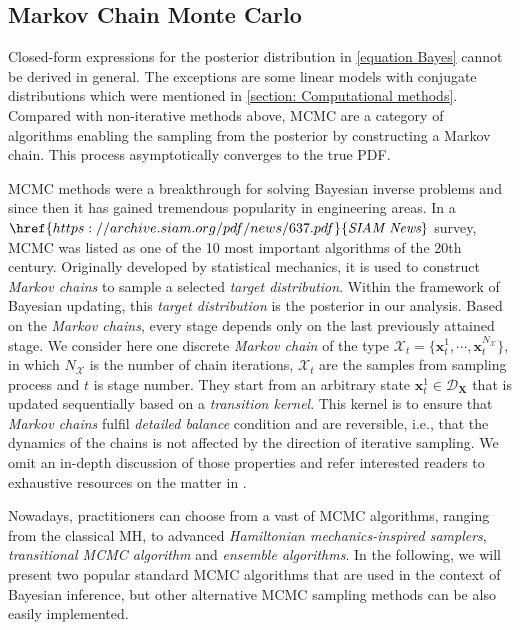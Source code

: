 \subsection{Markov Chain Monte Carlo}
Closed-form expressions for the posterior distribution in \cref{equation Bayes} cannot be derived in general. The exceptions are some linear models with conjugate distributions which were mentioned in \cref{section: Computational methods}. Compared with non-iterative methods above, \acrfull{MCMC} are a category of algorithms enabling the sampling from the posterior by constructing a Markov chain. This process asymptotically converges to the true \acrshort{PDF}.

\acrshort{MCMC} methods were a breakthrough for solving Bayesian inverse problems and since then it has gained tremendous popularity in engineering areas. In a $\href{https://archive.siam.org/pdf/news/637.pdf}{\textit{SIAM News}}$ survey, \acrshort{MCMC} was listed as one of the 10 most important algorithms of the 20th century. Originally developed by statistical mechanics, it is used to construct \textit{Markov chains} to sample a selected \textit{target distribution}. Within the framework of Bayesian updating, this \textit{target distribution} is the posterior in our analysis. Based on the \textit{Markov chains}, every stage depends only on the last previously attained stage. We consider here one discrete \textit{Markov chain} of the type $\mathcal{X}_{t} =\{\boldsymbol{x}_{t}^{1},\cdots,\boldsymbol{x}_{t}^{N_{\mathcal{X}}}\}$, in which $N_{\mathcal{X}}$ is the number of chain iterations, $\mathcal{X}_{t}$ are the samples from sampling process and $t$ is stage number. They start from an arbitrary state $\boldsymbol{x}_{t}^{1} \in \mathcal{D}_{\bm{X}}$ that is updated sequentially based on a \textit{transition kernel}. This kernel is to ensure that \textit{Markov chains} fulfil \textit{detailed balance} condition and are reversible, i.e., that the dynamics of the chains is not affected by the direction of iterative sampling. We omit an in-depth discussion of those properties and refer interested readers to exhaustive resources on the matter in \cite{murphy2012}.

Nowadays, practitioners can choose from a vast of \acrshort{MCMC} algorithms, ranging from the classical \acrfull{MH}, to advanced \textit{Hamiltonian mechanics-inspired samplers}, \textit{transitional MCMC algorithm} and \textit{ensemble algorithms}. In the following, we will present two popular standard \acrshort{MCMC} algorithms that are used in the context of Bayesian inference, but other alternative \acrshort{MCMC} sampling methods can be also easily implemented.
